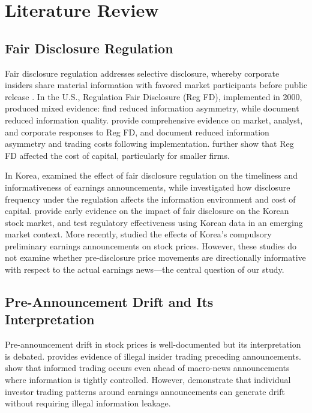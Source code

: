 \documentclass[review,authoryear]{elsarticle}
\begin{document}
\section{Literature Review}
\label{sec:literature}

\subsection{Fair Disclosure Regulation}

Fair disclosure regulation addresses selective disclosure, whereby corporate insiders share material information with favored market participants before public release \citep{heflin2003regulation}. In the U.S., Regulation Fair Disclosure (Reg FD), implemented in 2000, produced mixed evidence: \citet{ahmed2003impact} find reduced information asymmetry, while \citet{heflin2003regulation} document reduced information quality. \citet{bailey2003regulation} provide comprehensive evidence on market, analyst, and corporate responses to Reg FD, and \citet{eleswarapu2004impact} document reduced information asymmetry and trading costs following implementation. \citet{gomes2007sec} further show that Reg FD affected the cost of capital, particularly for smaller firms.

In Korea, \citet{yun2012fair} examined the effect of fair disclosure regulation on the timeliness and informativeness of earnings announcements, while \citet{park2020disclosure} investigated how disclosure frequency under the regulation affects the information environment and cost of capital. \citet{yoon2011impact} provide early evidence on the impact of fair disclosure on the Korean stock market, and \citet{lee2012testing} test regulatory effectiveness using Korean data in an emerging market context. More recently, \citet{shin2023korea} studied the effects of Korea's compulsory preliminary earnings announcements on stock prices. However, these studies do not examine whether pre-disclosure price movements are directionally informative with respect to the actual earnings news---the central question of our study.

\subsection{Pre-Announcement Drift and Its Interpretation}

Pre-announcement drift in stock prices is well-documented but its interpretation is debated. \citet{meulbroek1992comparison} provides evidence of illegal insider trading preceding announcements. \citet{bernile2016can} show that informed trading occurs even ahead of macro-news announcements where information is tightly controlled. However, \citet{kaniel2012individual} demonstrate that individual investor trading patterns around earnings announcements can generate drift without requiring illegal information leakage.
\end{document}
